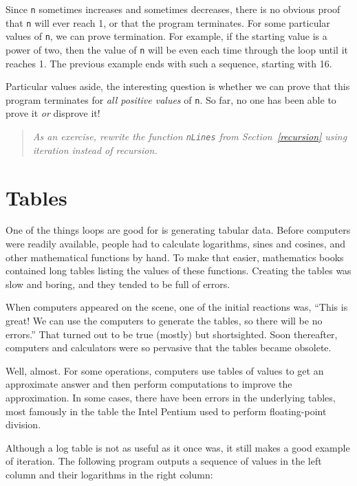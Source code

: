 Since {\tt n} sometimes increases and sometimes decreases, there is no
obvious proof that {\tt n} will ever reach 1, or that the program
terminates.  For some particular values of {\tt n}, we can prove
termination.  For example, if the starting value is a power of two,
then the value of {\tt n} will be even each time through the loop
until it reaches 1. The previous example ends with such a sequence,
starting with 16.

Particular values aside, the interesting question is whether we can
prove that this program terminates for {\em all positive values} of {\tt n}.
So far, no one has been able to prove it {\em or} disprove it!

\begin{quote}
{\em As an exercise, rewrite the function {\tt nLines} from
Section~\ref{recursion} using iteration instead of recursion.}
\end{quote}


\section{Tables}
\label{tables}

One of the things loops are good for is generating tabular data.
Before computers were readily available, people had to calculate
logarithms, sines and cosines, and other mathematical functions
by hand.  To make that easier, mathematics books contained long tables
listing the values of these functions.  Creating the tables was
slow and boring, and they tended to be full of errors.

When computers appeared on the scene, one of the initial reactions
was, ``This is great!  We can use the computers to generate the tables,
so there will be no errors.'' That turned out to be true (mostly) but
shortsighted.  Soon thereafter, computers and calculators were so
pervasive that the tables became obsolete.

Well, almost.  For some operations, computers use
tables of values to get an approximate answer and then perform
computations to improve the approximation.  In some cases, there have
been errors in the underlying tables, most famously in the table the
Intel Pentium used to perform floating-point division.


Although a log table is not as useful as it once was, it still makes
a good example of iteration.  The following program outputs a sequence
of values in the left column and their logarithms in the right column:

